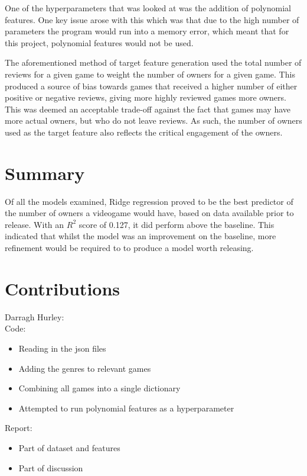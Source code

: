 One of the hyperparameters that was looked at was the addition of polynomial features. One key issue arose with this which was that due to the high number of parameters the program would run into a memory error, which meant that for this project, polynomial features would not be used.

The aforementioned method of target feature generation used the total number of reviews for a given game to weight the number of owners for a given game. This produced a source of bias towards games that received a higher number of either positive or negative reviews, giving more highly reviewed games more owners. This was deemed an acceptable trade-off against the fact that games may have more actual owners, but who do not leave reviews. As such, the number of owners used as the target feature also reflects the critical engagement of the owners.

\section{Summary}
Of all the models examined, Ridge regression proved to be the best predictor of the number of owners a videogame would have, based on data available prior to release. With an $R^2$ score of 0.127, it did perform above the baseline. This indicated that whilst the model was an improvement on the baseline, more refinement would be required to to produce a model worth releasing.

\section{Contributions}

\hspace{10pt} Darragh Hurley:\\

Code:
\begin{itemize}
    \item Reading in the json files
    \item Adding the genres to relevant games
    \item Combining all games into a single dictionary
    \item Attempted to run polynomial features as a hyperparameter
\end{itemize}

Report:
\begin{itemize}
    \item Part of dataset and features
    \item Part of discussion
\end{itemize}


